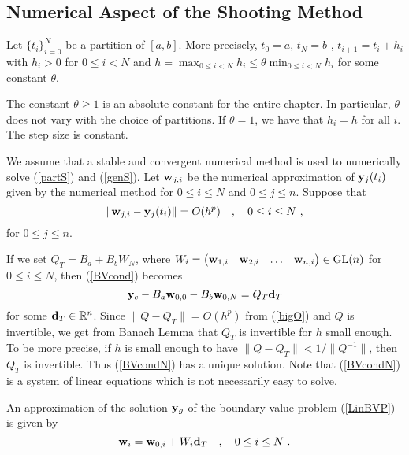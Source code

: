 \subsection{Numerical Aspect of the Shooting Method}

Let $\{t_i\}_{i=0}^N$ be a partition of $[a,b]$.  More
precisely, $t_0 = a$, $t_N = b$ , $t_{i+1} = t_i + h_i$ with $h_i > 0$
for $0\leq i < N$ and
$\displaystyle h = \max_{0\leq i < N} h_i \leq \theta \min_{0\leq i < N} h_i$
for some constant $\theta$.

\begin{rmk}[Important]
The constant $\theta \geq 1$ is an absolute constant for the entire
chapter.  In particular, $\theta$ does not vary with the choice of
partitions.  If $\theta = 1$, we have that $h_i = h$ for all $i$.  The
step size is constant.
\end{rmk}

We assume that a stable and convergent numerical method is used to
numerically solve (\ref{partS}) and (\ref{genS}).  Let
$\mathbf{w}_{j,i}$ be the numerical approximation of $\mathbf{y}_j(t_i)$
given by the numerical method for $0\leq i \leq N$ and $0\leq j \leq n$.
Suppose that
\begin{equation} \label{bigO}
\| \mathbf{w}_{j,i} - \mathbf{y}_j(t_i) \| = O(h^p) \quad , \quad 0 \leq i
\leq N \ ,
\end{equation}
for $0\leq j \leq n$.

If we set $Q_T = B_a + B_b W_N$, where
$\displaystyle W_i = \begin{pmatrix}
\mathbf{w}_{1,i} & \mathbf{w}_{2,i} & \ldots & \mathbf{w}_{n,i} \end{pmatrix}
\in \mathrm{GL}(n)$ for $0 \leq i \leq N$, then (\ref{BVcond}) becomes
\begin{equation} \label{BVcondN}
\mathbf{y}_c - B_a \mathbf{w}_{0,0} - B_b \mathbf{w}_{0,N} = Q_T\mathbf{d}_T
\end{equation}
for some $\mathbf{d}_T \in \mathbb{R}^n$.
Since $\| Q - Q_T \| = O(h^p)$ from (\ref{bigO}) and $Q$ is
invertible, we get from Banach Lemma that $Q_T$ is invertible for $h$
small enough.  To be more precise, if $h$ is small enough to have
$\|Q - Q_T\| < 1/\|Q^{-1}\|$, then $Q_T$ is invertible.  Thus
(\ref{BVcondN}) has a unique solution.  Note that (\ref{BVcondN}) is a
system of linear equations which is not necessarily easy to solve.

An approximation of the solution $\mathbf{y}_g$ of the boundary value
problem (\ref{LinBVP}) is given by
\[
\mathbf{w}_i = \mathbf{w}_{0,i} + W_i \mathbf{d}_T \quad , \quad 0 \leq i \leq N \ .
\]

